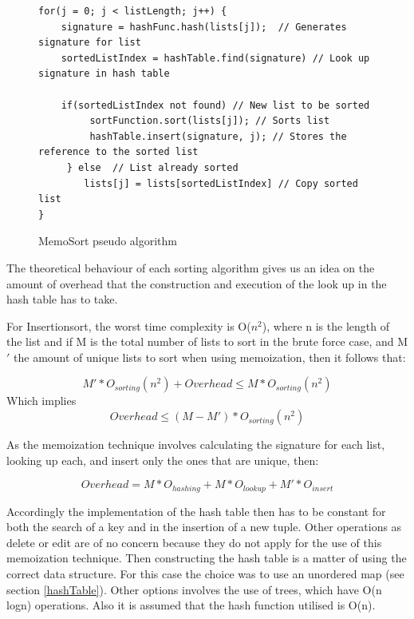 \documentclass[a4paper,12pt]{article}
\begin{document}
\begin{figure}[H]
\begin{small}
\begin{verbatim}
for(j = 0; j < listLength; j++) {
    signature = hashFunc.hash(lists[j]);  // Generates signature for list
    sortedListIndex = hashTable.find(signature) // Look up signature in hash table
    
    if(sortedListIndex not found) // New list to be sorted
         sortFunction.sort(lists[j]); // Sorts list
         hashTable.insert(signature, j); // Stores the reference to the sorted list
     } else  // List already sorted
        lists[j] = lists[sortedListIndex] // Copy sorted list
}
\end{verbatim}
\end{small}
\caption{MemoSort pseudo algorithm}
\label{fig:MemoSortAlgo}
\end{figure}

The theoretical behaviour of each sorting algorithm gives us an idea on the amount of overhead that the construction and  execution of the look up in the hash table has to take. 

For Insertionsort, the worst time complexity is O($n^2$), where n is the length of the list and if M is the total number of lists to sort in the brute force case, and M$'$ the amount of unique lists to sort when using memoization, then it follows that:

\begin{equation}
M' * O_{sorting}(n^2)  + Overhead \leq  M * O_{sorting}(n^2) 
\end{equation}
Which implies
\begin{equation}
 Overhead \leq  (M - M') *  O_{sorting}(n^2)
\end{equation}

As the memoization technique involves calculating the signature for each list, looking up each, and insert only the ones that are unique, then:

\begin{equation}
Overhead =  M * O_{hashing} + M * O_{lookup} + M' * O_{insert}
\end{equation}

Accordingly the implementation of the hash table then has to be constant for both the search of a key and in the insertion of a new tuple. Other operations as delete or edit are of no concern because they do not apply for the use of this memoization technique. Then constructing the hash table is a matter of using the correct data structure. For this case the choice was to use an unordered map (see  section \ref{hashTable}). Other options involves the use of trees, which have O(n logn) operations. Also it is assumed that the hash function utilised is O(n). 
\end{document}
